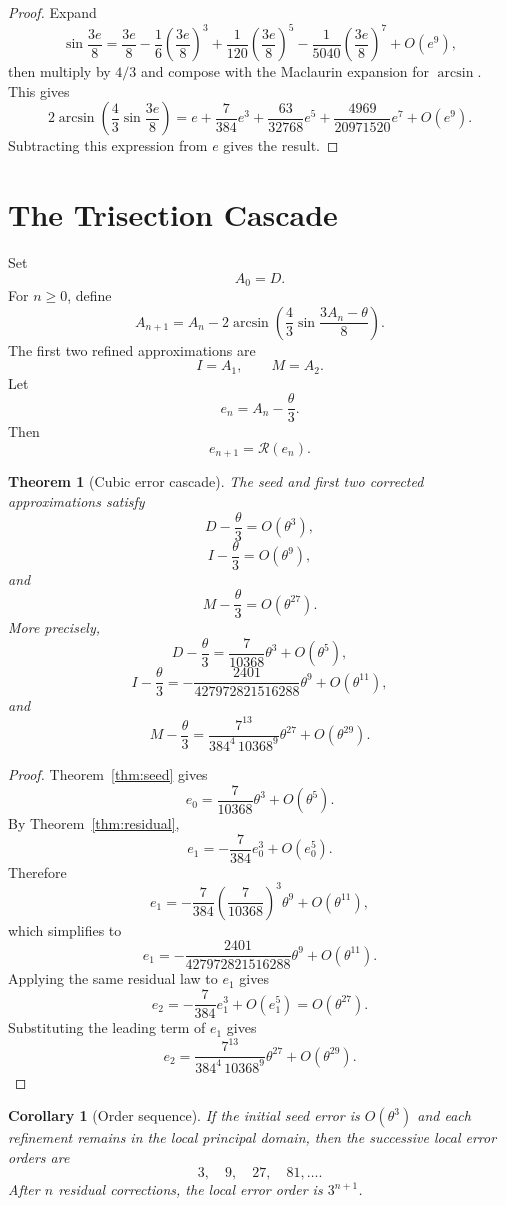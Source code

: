 \documentclass[11pt]{article}
\newtheorem{theorem}{Theorem}
\newtheorem{corollary}{Corollary}
\theoremstyle{remark}
\newcommand{\Rop}{\mathscr{R}}
\begin{document}
\begin{proof}
Expand
\[
\sin\frac{3e}{8}
=
\frac{3e}{8}
-
\frac{1}{6}\left(\frac{3e}{8}\right)^3
+
\frac{1}{120}\left(\frac{3e}{8}\right)^5
-
\frac{1}{5040}\left(\frac{3e}{8}\right)^7
+
O(e^9),
\]
then multiply by $4/3$ and compose with the Maclaurin expansion for $\arcsin$.
This gives
\[
2\arcsin\!\left(
\frac43\sin\frac{3e}{8}
\right)
=
e
+
\frac{7}{384}e^3
+
\frac{63}{32768}e^5
+
\frac{4969}{20971520}e^7
+
O(e^9).
\]
Subtracting this expression from $e$ gives the result.
\end{proof}

\section{The Trisection Cascade}

Set
\[
A_0=D.
\]
For $n\ge 0$, define
\[
A_{n+1}
=
A_n
-
2\arcsin\!\left(
\frac43\sin\frac{3A_n-\theta}{8}
\right).
\]
The first two refined approximations are
\[
I=A_1,
\qquad
M=A_2.
\]
Let
\[
e_n=A_n-\frac{\theta}{3}.
\]
Then
\[
e_{n+1}=\Rop(e_n).
\]

\begin{theorem}[Cubic error cascade]\label{thm:cascade}
The seed and first two corrected approximations satisfy
\[
D-\frac{\theta}{3}=O(\theta^3),
\]
\[
I-\frac{\theta}{3}=O(\theta^9),
\]
and
\[
M-\frac{\theta}{3}=O(\theta^{27}).
\]
More precisely,
\[
D-\frac{\theta}{3}
=
\frac{7}{10368}\theta^3+O(\theta^5),
\]
\[
I-\frac{\theta}{3}
=
-
\frac{2401}{427972821516288}\theta^9
+
O(\theta^{11}),
\]
and
\[
M-\frac{\theta}{3}
=
\frac{7^{13}}{384^4\,10368^9}\theta^{27}
+
O(\theta^{29}).
\]
\end{theorem}

\begin{proof}
Theorem~\ref{thm:seed} gives
\[
e_0
=
\frac{7}{10368}\theta^3+O(\theta^5).
\]
By Theorem~\ref{thm:residual},
\[
e_1
=
-\frac{7}{384}e_0^3+O(e_0^5).
\]
Therefore
\[
e_1
=
-\frac{7}{384}\left(\frac{7}{10368}\right)^3\theta^9
+
O(\theta^{11}),
\]
which simplifies to
\[
e_1
=
-
\frac{2401}{427972821516288}\theta^9
+
O(\theta^{11}).
\]
Applying the same residual law to $e_1$ gives
\[
e_2
=
-\frac{7}{384}e_1^3+O(e_1^5)
=
O(\theta^{27}).
\]
Substituting the leading term of $e_1$ gives
\[
e_2
=
\frac{7^{13}}{384^4\,10368^9}\theta^{27}
+
O(\theta^{29}).
\]
\end{proof}

\begin{corollary}[Order sequence]
If the initial seed error is $O(\theta^3)$ and each refinement remains in the local
principal domain, then the successive local error orders are
\[
3,\quad 9,\quad 27,\quad 81,\ldots .
\]
After $n$ residual corrections, the local error order is $3^{n+1}$.
\end{corollary}
\end{document}

